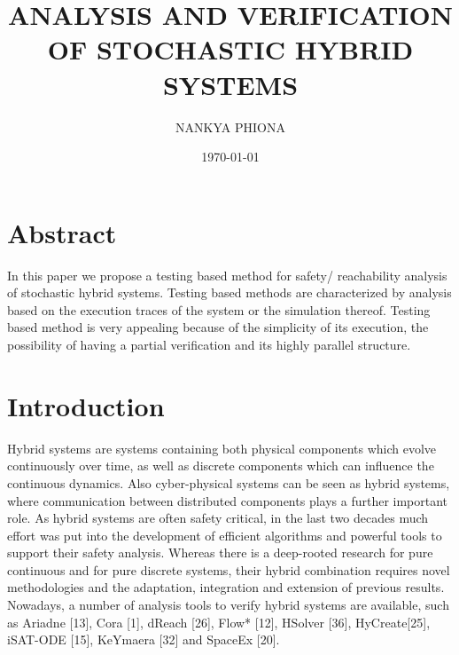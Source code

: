 \documentclass[14pt]{article}
\begin{document}
\title{ANALYSIS AND VERIFICATION OF STOCHASTIC HYBRID SYSTEMS}

\author{NANKYA PHIONA}
\date{\today}

\maketitle

\section{Abstract}
In this paper we propose a testing based method for safety/ reachability analysis of stochastic hybrid systems. Testing based methods are characterized by analysis based on the execution traces of the system or the simulation thereof. Testing based method is very appealing because of the simplicity of its execution, the possibility of having a partial verification and its highly parallel structure.

\section{Introduction}
Hybrid systems are systems containing both physical components which evolve continuously over time, as well as discrete components which can influence the continuous dynamics. Also cyber-physical systems can be seen as hybrid systems, where communication between distributed components plays a further important role. As hybrid systems are often safety critical, in the last two decades much effort was put into the development of efficient algorithms and powerful tools to support their safety analysis. Whereas there is a deep-rooted research for pure
continuous and for pure discrete systems, their hybrid combination requires novel methodologies and the adaptation, integration and extension of previous results.
Nowadays, a number of analysis tools to verify  hybrid systems are available, such as
Ariadne [13], Cora [1], dReach [26], Flow* [12], HSolver [36], HyCreate[25], iSAT-ODE [15], KeYmaera [32] and SpaceEx [20].
\end{document}

